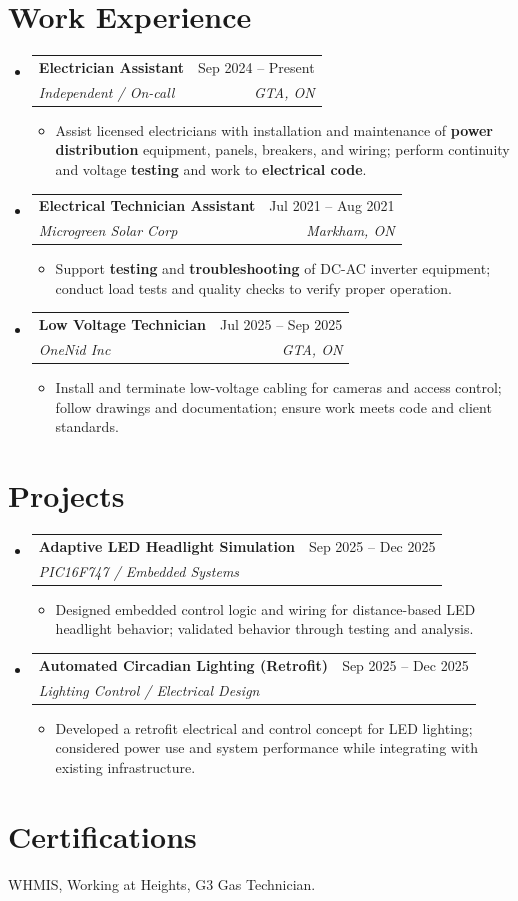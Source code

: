 \documentclass[letterpaper,11pt]{article}
\makeatletter
\newcommand{\resumeItem}[1]{\item\small{{#1 \vspace{-2pt}}}}
\newcommand{\resumeSubheading}[4]{
  \vspace{-4pt}\item
    \begin{tabular*}{0.97\textwidth}[t]{l@{\extracolsep{\fill}}r}
      \textbf{#1} & #2 \\
      \textit{\small #3} & \textit{\small #4} \\
    \end{tabular*}\vspace{-8pt}
}
\newcommand{\resumeSubHeadingListStart}{\begin{itemize}[leftmargin=0.15in, label={}]}
\newcommand{\resumeSubHeadingListEnd}{\end{itemize}}
\newcommand{\resumeItemListStart}{\begin{itemize}}
\newcommand{\resumeItemListEnd}{\end{itemize}\vspace{-5pt}}
\makeatother
\begin{document}
\section{Work Experience}
\resumeSubHeadingListStart

\resumeSubheading
  {Electrician Assistant}{Sep 2024 -- Present}
  {Independent / On-call}{GTA, ON}
\resumeItemListStart
  \resumeItem{Assist licensed electricians with installation and maintenance of \textbf{power distribution} equipment, panels, breakers, and wiring; perform continuity and voltage \textbf{testing} and work to \textbf{electrical code}.}
\resumeItemListEnd

\resumeSubheading
  {Electrical Technician Assistant}{Jul 2021 -- Aug 2021}
  {Microgreen Solar Corp}{Markham, ON}
\resumeItemListStart
  \resumeItem{Support \textbf{testing} and \textbf{troubleshooting} of DC-AC inverter equipment; conduct load tests and quality checks to verify proper operation.}
\resumeItemListEnd

\resumeSubheading
  {Low Voltage Technician}{Jul 2025 -- Sep 2025}
  {OneNid Inc}{GTA, ON}
\resumeItemListStart
  \resumeItem{Install and terminate low-voltage cabling for cameras and access control; follow drawings and documentation; ensure work meets code and client standards.}
\resumeItemListEnd

\resumeSubHeadingListEnd

\section{Projects}
\resumeSubHeadingListStart
\resumeSubheading
  {Adaptive LED Headlight Simulation}{Sep 2025 -- Dec 2025}
  {PIC16F747 / Embedded Systems}{ }
\resumeItemListStart
  \resumeItem{Designed embedded control logic and wiring for distance-based LED headlight behavior; validated behavior through testing and analysis.}
\resumeItemListEnd

\resumeSubheading
  {Automated Circadian Lighting (Retrofit)}{Sep 2025 -- Dec 2025}
  {Lighting Control / Electrical Design}{ }
\resumeItemListStart
  \resumeItem{Developed a retrofit electrical and control concept for LED lighting; considered power use and system performance while integrating with existing infrastructure.}
\resumeItemListEnd
\resumeSubHeadingListEnd

\section{Certifications}
WHMIS, Working at Heights, G3 Gas Technician.
\end{document}
